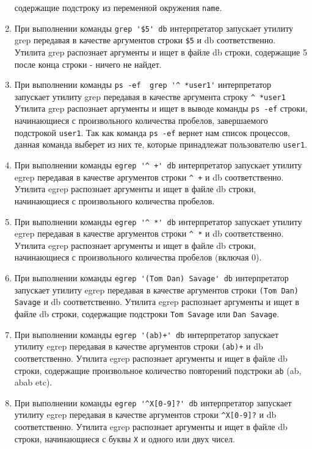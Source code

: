 \documentclass[12pt, a4paper]{article}
\begin{document}
\begin{enumerate}
    содержащие подстроку из переменной окружения \verb|name|.
  \item При выполнении команды \verb|grep '$5' db| интерпретатор запускает
    утилиту grep передавая в качестве аргументов строки \verb|$5| и db
    соответственно. Утилита grep распознает аргументы и ищет в файле db строки,
    содержащие 5 после конца строки - ничего не найдет.
  \item При выполнении команды \verb|ps -ef  grep '^ *user1'| интерпретатор запускает
    утилиту grep передавая в качестве аргумента строку \verb|^ *user1|
    Утилита grep распознает аргументы и ищет в выводе команды \verb|ps -ef| строки,
    начинающиеся с произвольного количества пробелов, завершаемого подстрокой \verb|user1|.
    Так как команда \verb|ps -ef| вернет нам список процессов, данная команда
    выберет из них те, которые принадлежат пользователю \verb|user1|.
  \item При выполнении команды \verb|egrep '^ +' db| интерпретатор запускает
    утилиту egrep передавая в качестве аргументов строки \verb|^ +| и db
    соответственно. Утилита egrep распознает аргументы и ищет в файле db строки,
    начинающиеся с произвольного количества пробелов.
  \item При выполнении команды \verb|egrep '^ *' db| интерпретатор запускает
    утилиту egrep передавая в качестве аргументов строки \verb|^ *| и db
    соответственно. Утилита egrep распознает аргументы и ищет в файле db строки,
    начинающиеся с произвольного количества пробелов (включая 0).
  \item При выполнении команды \verb|egrep '(Tom Dan) Savage' db| интерпретатор запускает
    утилиту egrep передавая в качестве аргументов строки \verb|(Tom Dan) Savage| и db
    соответственно. Утилита egrep распознает аргументы и ищет в файле db строки,
    содержащие подстроки \verb|Tom Savage| или \verb|Dan Savage|.
  \item При выполнении команды \verb|egrep '(ab)+' db| интерпретатор запускает
    утилиту egrep передавая в качестве аргументов строки \verb|(ab)+| и db
    соответственно. Утилита egrep распознает аргументы и ищет в файле db строки,
    содержащие произвольное количество повторений подстроки \verb|ab| (ab, abab etc).
  \item При выполнении команды \verb|egrep '^X[0-9]?' db| интерпретатор запускает
    утилиту egrep передавая в качестве аргументов строки \verb|^X[0-9]?| и db
    соответственно. Утилита egrep распознает аргументы и ищет в файле db строки,
    начинающиеся с буквы \verb|X| и одного или двух чисел.

\end{enumerate}
\end{document}
